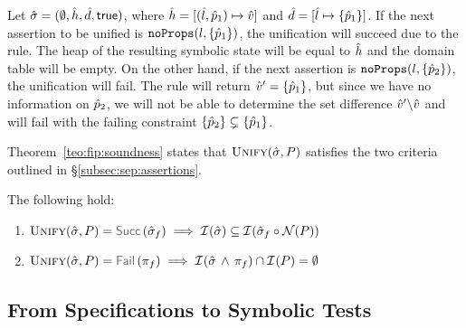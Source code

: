 
Let $\hat{\sigma}=(\emptyset, \hat{h}, \hat{d}, {\sf true})$, where $\hat{h} = [(\hat{l}, \hat{p}_1) \mapsto \hat{v}]$ and $\hat{d} = [ \hat{l} \mapsto \{ \hat{p}_1 \}]$. If the next assertion to be unified is $\texttt{noProps}(l, \{ \hat{p}_1 \})$, the unification will succeed due to the  rule. The heap of the resulting symbolic state will be equal to $\hat{h}$ and the domain table will be empty. On the other hand, if the next assertion is $\texttt{noProps}(l, \{ \hat{p}_2 \})$, the unification will fail. The  rule will return $\hat{v}' = \{ \hat{p}_1 \}$, but since we have no information on $\hat{p}_2$, we will not be able to determine the set difference $\hat{v}'\backslash\hat{v}$ and will fail with the failing constraint $\{ \hat{p}_2 \} \subsetneq \{ \hat{p}_1 \}$.

Theorem~\ref{teo:fip:soundness} states that $\textsc{Unify}(\hat{\sigma}, P)$ satisfies the two criteria 
outlined in \S\ref{subsec:sep:assertions}.

\begin{theorem}\label{teo:fip:soundness} 
The following hold: 
\begin{enumerate}%
\setlength{\itemsep}{0.1cm}
\item $\unificationfun(\sstate, \pass) = \success{\sstate_f}
        \implies 
        \interpret{}{}(\sstate) \subseteq \interpret{}{}(\sstate_f \statecompose \normaliser(\pass))$
 \item  $\unificationfun(\sstate, \pass) = \fail{\pc_f} 
   \implies
   \interpret{}{}(\sstate \, \wedge \, \pc_f) \cap \interpret{}{}(\pass) = \emptyset$
\end{enumerate}
\end{theorem}


\subsection{From Specifications to Symbolic Tests}\label{specs:to:symbolic:tests}

